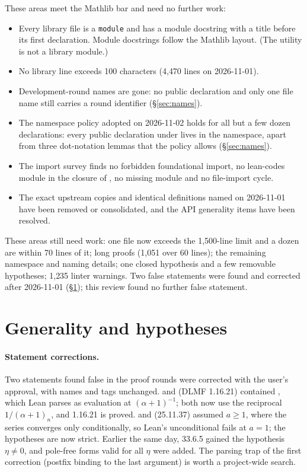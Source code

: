 \documentclass[11pt,a4paper]{article}
\begin{document}
These areas meet the Mathlib bar and need no further work:

\begin{itemize}
  \item Every library file is a \texttt{module} and has a module docstring with a title before
    its first declaration. Module docstrings follow the Mathlib layout. (The utility
     is not a library module.)
  \item No library line exceeds 100 characters (4{,}470 lines on 2026-11-01).
  \item Development-round names are gone: no public declaration and only one file name still
    carries a round identifier (\S\ref{sec:names}).
  \item The namespace policy adopted on 2026-11-02 holds for all but a few dozen declarations:
    every public declaration under  lives in the  namespace, apart from
    three dot-notation lemmas that the policy allows (\S\ref{sec:names}).
  \item The import survey finds no forbidden foundational import, no lean-codes module in the
    closure of , no missing module and no file-import cycle.
  \item The exact upstream copies and identical definitions named on 2026-11-01 have been
    removed or consolidated, and the API generality items have been resolved.
\end{itemize}

These areas still need work: one file now exceeds the 1{,}500-line limit and a dozen are
within 70 lines of it; long proofs (1{,}051 over 60 lines); the remaining namespace and naming
details; one closed hypothesis and a few removable hypotheses; 1{,}235 linter warnings. Two
false statements were found and corrected after 2026-11-01 (\S\ref{sec:generality}); this
review found no further false statement.

\section{Generality and hypotheses}\label{sec:generality}

\paragraph{Statement corrections.}
Two statements found false in the proof rounds were corrected with the user's approval, with
names and tags unchanged.  and
 (DLMF 1.16.21) contained
, which Lean parses as evaluation at
$(\alpha+1)^{-1}$; both now use the reciprocal $1/(\alpha+1)_n$, and 1.16.21 is proved.
 and 
(25.11.37) assumed $a\ge1$, where the series converges only conditionally, so Lean's
unconditional  fails at $a=1$; the hypotheses are now strict. Earlier the same
day, 33.6.5 gained the hypothesis $\eta\ne0$, and pole-free forms valid for all $\eta$ were
added. The parsing trap of the first correction (postfix  binding to the last
argument) is worth a project-wide search.
\end{document}
